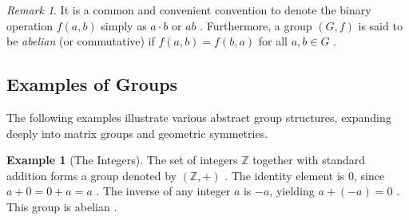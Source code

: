 \documentclass[11pt]{article}
\theoremstyle{definition}
\newtheorem{example}{Example}[section]
\theoremstyle{plain}
\theoremstyle{remark}
\newtheorem*{remark}{Remark}
\begin{document}
\begin{remark}
It is a common and convenient convention to denote the binary operation $f(a,b)$ simply as $a \cdot b$ or $ab$ \cite{dummit}. Furthermore, a group $(G, f)$ is said to be \emph{abelian} (or commutative) if $f(a,b) = f(b,a)$ for all $a, b \in G$ \cite{gallian}.
\end{remark}

\subsection{Examples of Groups} 

The following examples illustrate various abstract group structures, expanding deeply into matrix groups and geometric symmetries.

\begin{example}[The Integers]
The set of integers $\mathbb{Z}$ together with standard addition forms a group denoted by $(\mathbb{Z}, +)$ \cite{fraleigh}. The identity element is $0$, since $a+0 = 0+a = a$ \cite{dummit}. The inverse of any integer $a$ is $-a$, yielding $a + (-a) = 0$ \cite{dummit}. This group is abelian \cite{gallian}.
\end{example}
\end{document}
